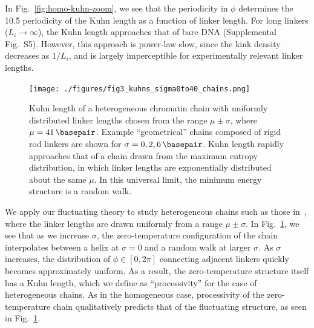 \documentclass[%
 reprint,
superscriptaddress,
showpacs,preprintnumbers,
 amsmath,amssymb,
 aps,
 prl,
]{revtex4-1}
\begin{document}
In Fig.~\ref{fig:homo-kuhn-zoom}, we see that the periodicity in $\phi$ determines the \SI{10.5}{\basepair} periodicity of the Kuhn
    length as a function of linker length.
For long linkers ($L_i\to\infty$), the Kuhn length approaches that of
    bare DNA (Supplemental Fig.~S5).
However, this approach is power-law slow, since the kink density decreases as $1/L_i$, and is largely imperceptible for experimentally relevant linker lengths.

\begin{figure}
    \centering
    \texttt{[image: ./figures/fig3\_kuhns\_sigma0to40\_chains.png]}
    \caption{Kuhn length of a heterogeneous chromatin chain with uniformly
    distributed linker lengths chosen from the range $\mu \pm \sigma$, where
    $\mu = \SI{41}{\basepair}$. Example ``geometrical'' chains composed of rigid
    rod linkers are shown for $\sigma = 0, 2, \SI{6}{\basepair}$. Kuhn length
    rapidly approaches that of a chain drawn from the maximum entropy
    distribution, in which linker lengths are exponentially distributed about
    the same $\mu$. In this universal limit, the minimum energy structure is a
    random walk.}\label{fig:hetero-geom}
\end{figure}

We apply our fluctuating theory to study heterogeneous chains such as those
    in~\cite{woodcock1993}, where the linker lengths are drawn uniformly from a
    range $\mu \pm \sigma$.
In Fig.~\ref{fig:hetero-geom}, we see that as we increase $\sigma$, the
    zero-temperature configuration of the chain interpolates between a helix at
    $\sigma = 0$ and a random walk at larger $\sigma$.
As $\sigma$ increases, the distribution of $\phi \in [0, 2\pi]$ connecting
    adjacent linkers quickly becomes approximately uniform.
As a result, the zero-temperature structure itself has a Kuhn length, which we define as ``processivity'' for the case of heterogeneous chains.
As in the homogeneous case, processivity of the zero-temperature chain qualitatively
    predicts that of the fluctuating structure, as seen in Fig.~\ref{fig:hetero-geom}.
\end{document}
